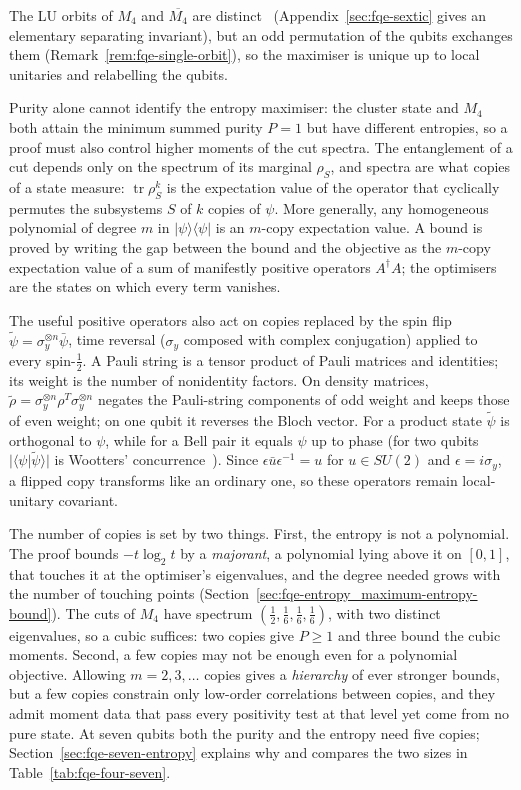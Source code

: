 \documentclass[11pt]{article}
\begin{document}
The LU orbits of $M_4$ and $\overline{M_4}$ are distinct~\cite[Prop.~7]{LWB} (Appendix~\ref{sec:fqe-sextic}
gives an elementary separating invariant), but an odd permutation of the qubits exchanges them
(Remark~\ref{rem:fqe-single-orbit}), so the maximiser is unique up to local unitaries and relabelling the qubits.

Purity alone cannot identify the entropy maximiser: the cluster state and $M_4$ both attain
the minimum summed purity $P=1$ but have different entropies, so a proof must also control higher moments of the cut spectra. The entanglement of
a cut depends only on the spectrum of its marginal $\rho_S$, and spectra are what copies of a state measure: $\operatorname{tr}\rho_S^k$ is the expectation value of the operator that
cyclically permutes the subsystems $S$ of $k$ copies of $\psi$. More generally, any homogeneous polynomial of degree $m$
in $|\psi\rangle\langle\psi|$ is an $m$-copy expectation value. A bound is proved by writing the gap between the bound
and the objective as the $m$-copy expectation value of a sum of manifestly positive operators $A^\dagger A$; the
optimisers are the states on which every term vanishes.

The useful positive operators also act on copies replaced by
the spin flip $\tilde\psi=\sigma_y^{\otimes n}\bar\psi$, time reversal ($\sigma_y$ composed with complex conjugation)
applied to every spin-$\tfrac12$. A Pauli string is a tensor product of Pauli matrices and identities; its weight is the number of nonidentity factors.
On density matrices, $\tilde\rho=\sigma_y^{\otimes n}\rho^T\sigma_y^{\otimes n}$ negates
the Pauli-string components of odd weight and keeps those of even weight; on one qubit it reverses the Bloch vector.
For a product state $\tilde\psi$ is orthogonal to $\psi$, while for a Bell pair it equals $\psi$ up to phase (for two qubits
$|\langle\psi|\tilde\psi\rangle|$ is Wootters' concurrence~\cite{Wootters}). Since
$\epsilon\bar u\epsilon^{-1}=u$ for $u\in SU(2)$ and $\epsilon=i\sigma_y$, a flipped copy transforms like an ordinary one, so these operators
remain local-unitary covariant.

The number of copies is set by two things. First, the entropy is not a polynomial. The proof bounds $-t\log_2t$ by a
\emph{majorant}, a polynomial lying above it on $[0,1]$, that touches it at the optimiser's eigenvalues,
and the degree needed grows with the number of touching points (Section~\ref{sec:fqe-entropy_maximum-entropy-bound}). The cuts of $M_4$ have spectrum
$(\tfrac12,\tfrac16,\tfrac16,\tfrac16)$, with two distinct eigenvalues, so a cubic suffices: two copies give $P\ge1$ and
three bound the cubic moments. Second, a few copies may not be enough even for a polynomial objective. Allowing
$m=2,3,\dots$ copies gives a \emph{hierarchy} of ever stronger bounds, but a few copies constrain only low-order
correlations between copies, and they admit moment data that pass every positivity test at that level yet come from no pure state.
At seven qubits both the purity and the entropy need five copies; Section~\ref{sec:fqe-seven-entropy} explains why and
compares the two sizes in Table~\ref{tab:fqe-four-seven}.
\end{document}
